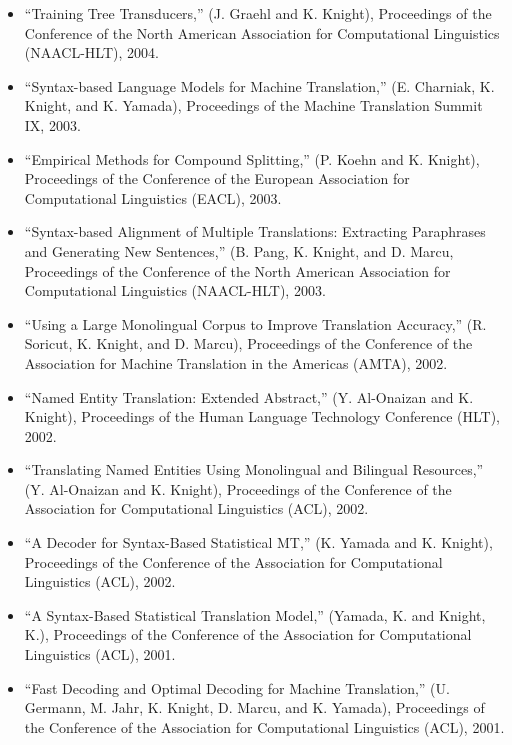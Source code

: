 \begin{itemize}
\item ``Training Tree Transducers,'' (J. Graehl and K. Knight),
Proceedings of the Conference of the 
North American Association for Computational Linguistics (NAACL-HLT), 
2004.

\item ``Syntax-based Language Models for Machine Translation,''
(E. Charniak, K. Knight, and K. Yamada), Proceedings of the
Machine Translation Summit IX, 2003.

\item ``Empirical Methods for Compound Splitting,''
(P. Koehn and K. Knight),
Proceedings of the Conference of 
the European Association for Computational Linguistics (EACL), 2003. 

\item ``Syntax-based Alignment of Multiple Translations:
Extracting Paraphrases and Generating New Sentences,''
(B. Pang, K. Knight, and D. Marcu, 
Proceedings of the Conference of the 
North American Association for Computational Linguistics (NAACL-HLT), 
2003.

\item ``Using a Large Monolingual Corpus to Improve Translation Accuracy,'' 
(R. Soricut, K. Knight, and D. Marcu), 
Proceedings of the Conference of the Association for Machine
Translation in the Americas (AMTA), 2002.

\item ``Named Entity Translation: Extended Abstract,'' (Y. Al-Onaizan and K. 
Knight), Proceedings of the Human Language Technology Conference (HLT), 2002. 

\item ``Translating Named Entities Using Monolingual and Bilingual 
Resources,'' (Y. Al-Onaizan and K. Knight), Proceedings of the Conference of 
the Association for Computational Linguistics (ACL), 2002. 

\item ``A Decoder for Syntax-Based Statistical MT,'' (K. Yamada and K. 
Knight), Proceedings of the Conference of the Association for Computational 
Linguistics (ACL), 2002. 

\item ``A Syntax-Based Statistical Translation Model,'' (Yamada, K. and 
Knight, K.), 
Proceedings of the Conference of the 
Association for Computational Linguistics (ACL), 
2001.

\item ``Fast Decoding and Optimal Decoding for Machine Translation,''
(U. Germann, M. Jahr, K. Knight, D. Marcu, and K. Yamada),
Proceedings of the Conference of the 
Association for Computational Linguistics (ACL), 2001.


\end{itemize}
